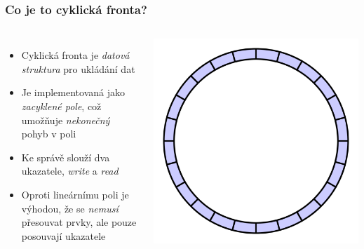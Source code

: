 \documentclass[]{fitthesispresn}
\begin{document}
    \begin{frame}
        \frametitle{Co je to cyklická fronta?}
        \begin{columns}
            \begin{itemize}
                \item Cyklická fronta je \emph{datová struktura} pro ukládání dat
                \item Je implementovaná jako \emph{zacyklené pole}, což umožňuje \emph{nekonečný} pohyb v poli
                \item Ke správě slouží dva ukazatele, \emph{write} a \emph{read}
                \item Oproti lineárnímu poli je výhodou, že se \emph{nemusí} přesouvat prvky, ale pouze posouvají ukazatele
            \end{itemize}
            \includegraphics[width=\textwidth]{img/circular_buffer_empty_circle.pdf} %
        \end{columns}
    \end{frame}
\end{document}
